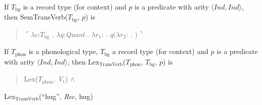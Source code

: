 \begin{ex} 
\begin{subex} 
 
\item  If $T_{\text{bg}}$ is a record type (for context) and $p$ is a
        predicate with arity $\langle\textit{Ind},\textit{Ind}\rangle$, then SemTransVerb($T_{\mathrm{bg}}$, $p$) is
        \begin{quote}
          $\ulcorner\lambda c$:$T_{\mathrm{bg}}$ . $\lambda
          q$:\textit{Quant} . $\lambda
          r_1$: . $q(\lambda r_2$:
          . $)\urcorner$
        \end{quote}
 
\item  If $T_{\mathrm{phon}}$ is a phonological type,
        $T_{\mathrm{bg}}$ a record type (for context) and $p$ is a
        predicate with arity $\langle\textit{Ind},\textit{Ind}\rangle$, then Lex$_{\mathrm{TransVerb}}$($T_{\mathrm{phon}}$,
        $T_{\mathrm{bg}}$, $p$) is
        \begin{quote}
          Lex($T_{\mathrm{phon}}$, \textit{V$_t$}) \d{$\wedge$}
        \end{quote}
        
      \item Lex$_{\mathrm{TransVerb}}$(``hug'', \textit{Rec}, hug)
        
 
\end{subex} 
   
\end{ex} 
  
